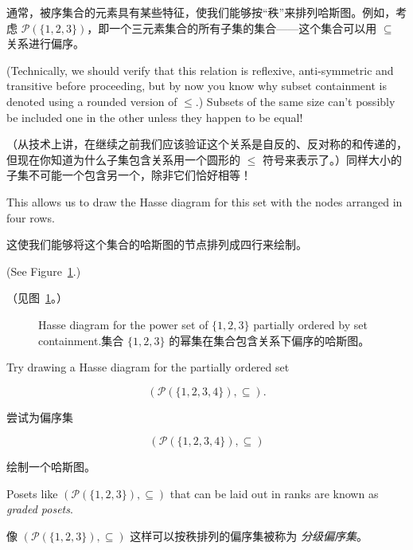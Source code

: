 通常，被序集合的元素具有某些特征，使我们能够按“秩”来排列哈斯图。例如，考虑 ${\mathcal P}(\{1,2,3\})$，即一个三元素集合的所有子集的集合——这个集合可以用 $\subseteq$ 关系进行偏序。

(Technically, we should verify that this relation is reflexive,
anti-symmetric and transitive before proceeding, but by now you know
why subset containment is denoted using a rounded version of $\leq$.)
Subsets of the same size can't possibly be included one in the other
unless they happen to be equal!

（从技术上讲，在继续之前我们应该验证这个关系是自反的、反对称的和传递的，但现在你知道为什么子集包含关系用一个圆形的 $\leq$ 符号来表示了。）同样大小的子集不可能一个包含另一个，除非它们恰好相等！

This allows us to draw the Hasse 
diagram for this set with the nodes arranged in four rows.

这使我们能够将这个集合的哈斯图的节点排列成四行来绘制。

(See Figure~\ref{fig:subset_hasse}.)  

（见图~\ref{fig:subset_hasse}。）

\begin{figure}[!hbtp]

\caption[Hasse diagram for $({\mathcal P}(\{1,2,3\}), \subseteq)$.$({\mathcal P}(\{1,2,3\}), \subseteq)$ 的哈斯图。]{Hasse %
diagram for the power set of $\{1,2,3\}$ partially ordered by %
set containment.集合 $\{1,2,3\}$ 的幂集在集合包含关系下偏序的哈斯图。}
\label{fig:subset_hasse} 
\end{figure}

\begin{exer}
Try drawing a Hasse diagram for the partially ordered set 

\[ ({\mathcal P}(\{1,2,3,4\}),\subseteq). \]

\end{exer}

\begin{exer}
尝试为偏序集

\[ ({\mathcal P}(\{1,2,3,4\}),\subseteq) \]

绘制一个哈斯图。
\end{exer}


Posets like $({\mathcal P}(\{1,2,3\}), \subseteq)$ that can be laid out
in ranks are known as  \emph{graded posets}.

像 $({\mathcal P}(\{1,2,3\}), \subseteq)$ 这样可以按秩排列的偏序集被称为  \emph{分级偏序集}。


